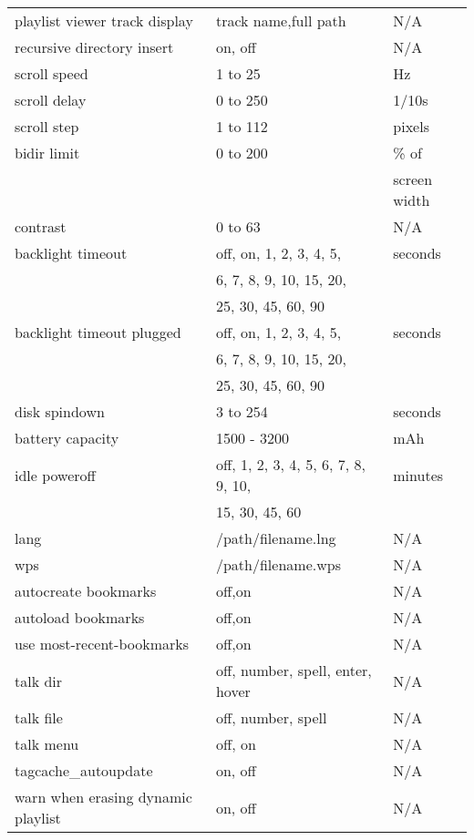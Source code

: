 \begin{center}
\begin{longtable}{@{}lll@{}}
    playlist viewer track display & track name,full path & N/A\\
    recursive directory insert & on, off & N/A\\
    scroll speed & 1 to 25 & Hz\\
    scroll delay & 0 to 250 & 1/10s\\
    scroll step & 1 to 112 & pixels\\
    bidir limit & 0 to 200 & \% of \\
                &          & screen width\\
    contrast & 0 to 63 & N/A\\
    backlight timeout & off, on, 1, 2, 3, 4, 5, & seconds\\
                      & 6, 7, 8, 9, 10, 15, 20, & \\
                      & 25, 30, 45, 60, 90 & \\
    backlight timeout plugged & off, on, 1, 2, 3, 4, 5, & seconds\\
                              & 6, 7, 8, 9, 10, 15, 20, & \\
                              & 25, 30, 45, 60, 90 & \\
    disk spindown & 3 to 254 & seconds\\
    battery capacity & 1500 - 3200 & mAh\\
    idle poweroff & off, 1, 2, 3, 4, 5, 6, 7, 8, 9, 10, & minutes\\
                  & 15, 30, 45, 60 & \\
    lang & /path/filename.lng & N/A\\
    wps & /path/filename.wps & N/A\\
    autocreate bookmarks & off,on & N/A\\
    autoload bookmarks & off,on & N/A\\
    use most-recent-bookmarks & off,on & N/A\\
    talk dir & off, number, spell, enter, hover & N/A\\
    talk file & off, number, spell & N/A\\
    talk menu & off, on & N/A\\
    tagcache\_autoupdate & on, off & N/A\\
    warn when erasing dynamic playlist & on, off & N/A\\
    

\end{longtable}
\end{center}
